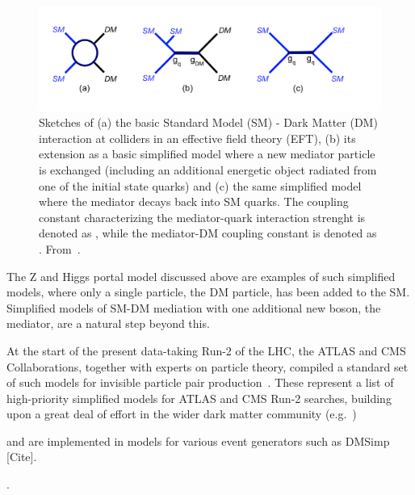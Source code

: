 
\begin{figure}[!htpb]
\includegraphics[width=\textwidth]{figures/MonoX.pdf}
\caption{Sketches of (a) the basic Standard Model (SM) - Dark Matter (DM) interaction at colliders in an effective field theory (EFT), (b) its extension as a basic simplified model where a new mediator particle is exchanged (including an additional energetic object radiated from one of the initial state quarks) and (c) the same simplified model where the mediator decays back into SM quarks. The coupling constant characterizing the mediator-quark interaction strenght is denoted as \gq, while the mediator-DM coupling constant is denoted as \gdm. From~\cite{monoXfig}.}
\label{fig:monoX}
\end{figure}

The Z and Higgs portal model discussed above are examples of such simplified models, where only a single particle, the DM particle, has been added to the SM. 
Simplified models of SM-DM mediation with one additional new boson, the mediator, are a natural step beyond this. 

At the start of the present data-taking Run-2 of the LHC, the ATLAS and CMS Collaborations, together with experts on particle theory, compiled a standard set of such models for invisible particle pair production~\cite{Abercrombie:2015wmb}. These represent a list of high-priority simplified models for ATLAS and CMS Run-2 searches, building upon a great deal of effort in the wider dark matter community (e.g.~\cite{Fox:2011pm,Yavin:14092893,Malik:2014ggr,Abdallah:2015ter}) 
\begin{marginnote}[]
 and are implemented in models for various event generators such as DMSimp [Cite]. 
\end{marginnote}. 


